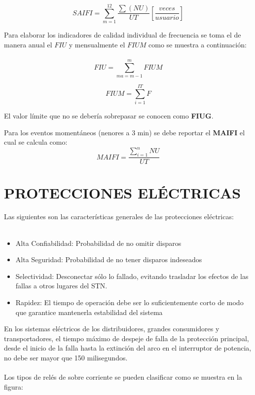\documentclass[a5paper]{book}%
\begin{document}
    \[ SAIFI  = \sum_{m=1}^{12}\dfrac{\sum(NU)}{UT}   \left[  \dfrac{veces}{usuario} \right]  \]

    Para elaborar los indicadores de calidad  individual de frecuencia se toma el de manera anual el $FIU$ y mensualmente el $FIUM$ como se muestra a continuación:\\\\

    \[  FIU = \sum_{ma=m-1}^{m} FIUM \]

    \[ FIUM = \sum_{i=1}^{IT} F\]

    El  valor límite que no se debería sobrepasar se conocen como  \textbf{FIUG}.

    Para los eventos momentáneos (nenores a 3 min) se debe reportar el \textbf{MAIFI} el cual se calcula como:
    \[ MAIFI = \dfrac{\sum_{i=1}^{n}NU }{UT}\]
    
    

    \chapter{PROTECCIONES ELÉCTRICAS}

    Las siguientes son las características generales de las protecciones eléctricas:\\\\
\begin{itemize}
	\item Alta Confiabilidad: Probabilidad de no omitir disparos
	\item Alta Seguridad: Probabilidad de no tener disparos indeseados
	\item Selectividad: Desconectar sólo lo fallado, evitando trasladar los efectos de las fallas a otros lugares del STN. 
	\item Rapidez: El tiempo de operación debe ser lo suficientemente corto de modo que garantice mantenerla estabilidad del sistema
        \end{itemize}

        En los sistemas eléctricos de los distribuidores, grandes consumidores y transportadores, el tiempo máximo de despeje de falla de la protección principal, desde el inicio de la falla hasta la extinción del arco en el interruptor de potencia, no debe
        ser mayor que 150 milisegundos.\\\\

        Los tipos de relés de sobre corriente se pueden clasificar como se muestra en la figura:
\end{document}
